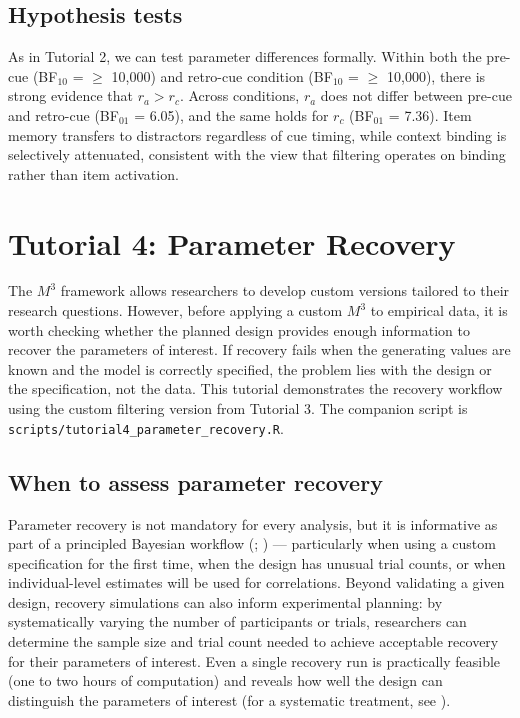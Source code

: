 \documentclass[
  man,
  floatsintext,
  longtable,
  nolmodern,
  notxfonts,
  notimes,
  colorlinks=true,linkcolor=blue,citecolor=blue,urlcolor=blue]{apa7}
\begin{document}
\subsection{Hypothesis tests}\label{hypothesis-tests-1}

As in Tutorial 2, we can test parameter differences formally. Within
both the pre-cue (BF\(_{10}\) = \(\geq\) 10,000) and retro-cue condition
(BF\(_{10}\) = \(\geq\) 10,000), there is strong evidence that
\(r_a > r_c\). Across conditions, \(r_a\) does not differ between
pre-cue and retro-cue (BF\(_{01}\) = 6.05), and the same holds for
\(r_c\) (BF\(_{01}\) = 7.36). Item memory transfers to distractors
regardless of cue timing, while context binding is selectively
attenuated, consistent with the view that filtering operates on binding
rather than item activation.

\section{Tutorial 4: Parameter
Recovery}\label{tutorial-4-parameter-recovery}

The \(M^3\) framework allows researchers to develop custom versions
tailored to their research questions. However, before applying a custom
\(M^3\) to empirical data, it is worth checking whether the planned
design provides enough information to recover the parameters of
interest. If recovery fails when the generating values are known and the
model is correctly specified, the problem lies with the design or the
specification, not the data. This tutorial demonstrates the recovery
workflow using the custom filtering version from Tutorial 3. The
companion script is \texttt{scripts/tutorial4\_parameter\_recovery.R}.

\subsection{When to assess parameter
recovery}\label{when-to-assess-parameter-recovery}

Parameter recovery is not mandatory for every analysis, but it is
informative as part of a principled Bayesian workflow
(;
) --- particularly
when using a custom specification for the first time, when the design
has unusual trial counts, or when individual-level estimates will be
used for correlations. Beyond validating a given design, recovery
simulations can also inform experimental planning: by systematically
varying the number of participants or trials, researchers can determine
the sample size and trial count needed to achieve acceptable recovery
for their parameters of interest. Even a single recovery run is
practically feasible (one to two hours of computation) and reveals how
well the design can distinguish the parameters of interest (for a
systematic treatment, see ).
\end{document}
